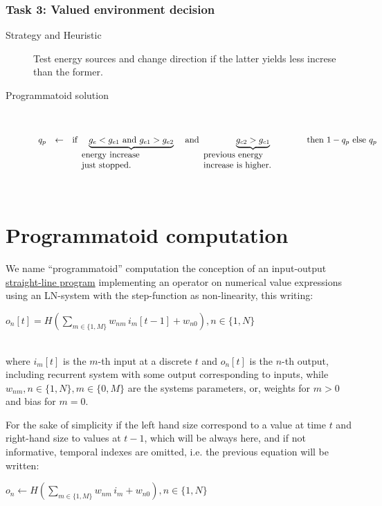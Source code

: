 \documentclass[a4]{article}
\newcommand{\eqline}[1]{~\vspace{0.1cm}\\\centerline{$#1$}\vspace{0.1cm}\\}
\begin{document}
\subsubsection{Task 3: Valued environment decision} \begin{description}
   \item[Strategy and Heuristic] Test energy sources and change direction if the latter yields less increse than the former.
   \item[Programmatoid solution] \eqline{\begin{array}{rcl}
       q_p &\leftarrow& \mbox{if } \underbrace{g_{e} < g_{e1}  \mbox{ and } g_{e1} > g_{e2}}_{\mbox{\parbox{4cm}{energy increase\\ just stopped.}}}
       \mbox{ and }  \underbrace{g_{c2} > g_{c1}}_{\mbox{\parbox{4cm}{previous energy \\ increase is higher.}}}
       \mbox{ then } 1 - q_p \mbox{ else } q_p \\
    \end{array}} \end{description}

\section{Programmatoid computation} \label{programmatoid}

We name ``programmatoid'' computation the conception of an input-output \href{https://en.wikipedia.org/wiki/Straight-line_program}{straight-line program} implementing an operator on numerical value expressions using an LN-system with the step-function as non-linearity, this writing:
\eqline{o_n[t] = H(\sum_{m\in\{1,M\}} w_{nm} \, i_m[t-1] + w_{n0}), n \in \{1, N\}}
where $i_m[t]$ is the $m$-th input at a discrete $t$ and $o_n[t]$ is the $n$-th output, including recurrent system with some output corresponding to inputs, while $w_{nm}, n \in \{1, N\}, m \in \{ 0, M \}$ are the systems parameters, or, weights for $m > 0$ and bias for $m = 0$.

For the sake of simplicity if the left hand size correspond to a value at time $t$ and right-hand size to values at $t-1$, which will be always here, and if not informative, temporal indexes are omitted, i.e. the previous equation will be written: 
\eqline{o_n  \leftarrow H(\sum_{m\in\{1,M\}} w_{nm} \, i_m + w_{n0}), n \in \{1, N\}}
\end{document}
